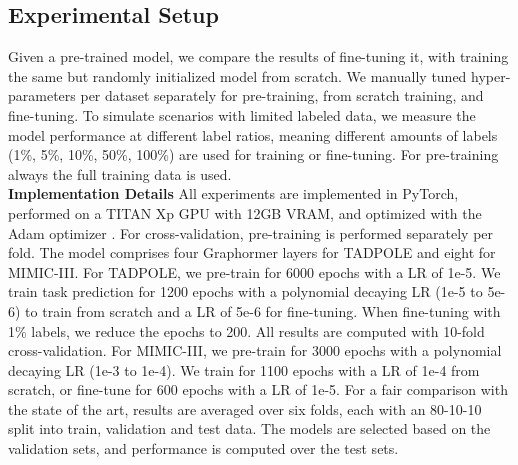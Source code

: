\documentclass[runningheads]{llncs}
\begin{document}
\subsection{Experimental Setup}
Given a pre-trained model, we compare the results of fine-tuning it, with training the same but randomly initialized model from scratch.
We manually tuned hyper-parameters per dataset separately for pre-training, from scratch training, and fine-tuning. To simulate scenarios with limited labeled data, we measure the model performance at different label ratios, meaning different amounts of labels (1\%, 5\%, 10\%, 50\%, 100\%) are used for training or fine-tuning. For pre-training always the full training data is used.\\
\textbf{Implementation Details}
All experiments are implemented in PyTorch, performed on a TITAN Xp GPU with 12GB VRAM, and optimized with the Adam optimizer \cite{kingma2014adam}. For cross-validation, pre-training is performed separately per fold. The model comprises four Graphormer layers for TADPOLE and eight for MIMIC-III. For TADPOLE, we pre-train for 6000 epochs with a LR of 1e-5. We train task prediction for 1200 epochs with a polynomial decaying LR (1e-5 to 5e-6) to train from scratch and a LR of 5e-6 for fine-tuning. When fine-tuning with 1\% labels, we reduce the epochs to 200. All results are computed with 10-fold cross-validation. For MIMIC-III, we pre-train for 3000 epochs with a polynomial decaying LR (1e-3 to 1e-4). We train for 1100 epochs with a LR of 1e-4 from scratch, or fine-tune for 600 epochs with a LR of 1e-5. For a fair comparison with the state of the art, results are averaged over six folds, each with an 80-10-10 split into train, validation and test data. The models are selected based on the validation sets, and performance is computed over the test sets.
\end{document}
